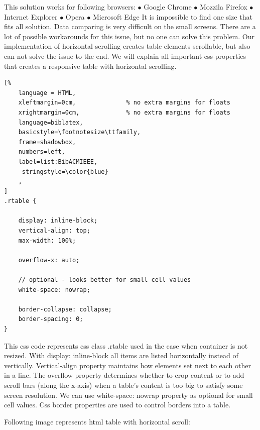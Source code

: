 This solution works for following browsers:
\newline $\bullet$ Google Chrome
\newline $\bullet$ Mozzila Firefox
\newline $\bullet$ Internet Explorer
\newline $\bullet$ Opera
\newline $\bullet$ Microsoft Edge
\newline
\newline It is impossible to find one size that fits all solution. Data comparing is very difficult on the small screens.
There are a lot of possible workarounds for this issue, but no one can solve this problem. 
Our implementation of horizontal scrolling creates table elements scrollable, but also can not solve the issue to the end.
We will explain all important css-properties that creates a responsive table with horizontal scrolling.

\begin{lstlisting}[%
    language = HTML, 
    xleftmargin=0cm,              % no extra margins for floats
    xrightmargin=0cm,             % no extra margins for floats
    language=biblatex,
    basicstyle=\footnotesize\ttfamily,
    frame=shadowbox,
    numbers=left,
    label=list:BibACMIEEE,
     stringstyle=\color{blue}
    ,
]
.rtable {

    display: inline-block;
    vertical-align: top;
    max-width: 100%;

    overflow-x: auto;

    // optional - looks better for small cell values
    white-space: nowrap;

    border-collapse: collapse;
    border-spacing: 0;
}

\end{lstlisting}

This css code represents css class .rtable used in the case when container is not resized.
With display: inline-block all items are listed horizontally instead of vertically.
Vertical-align property maintains how elements set next to each other in a line.
The overflow property determines whether to crop content or to add scroll bars (along the x-axis) when a table's content is too big to satisfy some screen resolution.
We can use white-space: nowrap property as optional for small cell values.
Css border properties are used to control borders into a table.  

Following image represents html table with horizontal scroll:

